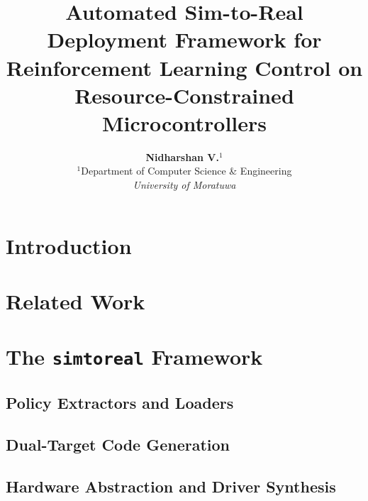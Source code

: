 \documentclass[10pt,twocolumn]{article}
\title{\textbf{\Large Automated Sim-to-Real Deployment Framework for Reinforcement Learning Control on Resource-Constrained Microcontrollers}}
\author{
    \textbf{Nidharshan V.}$^{1}$ \\
    $^{1}$Department of Computer Science \& Engineering \\
    \textit{University of Moratuwa } \\
}
\date{}
\begin{document}
\maketitle



\section{Introduction}


\section{Related Work}

\section{The \texttt{simtoreal} Framework}
\label{sec:framework}

\subsection{Policy Extractors and Loaders}

\subsection{Dual-Target Code Generation}

\subsection{Hardware Abstraction and Driver Synthesis}
\end{document}
